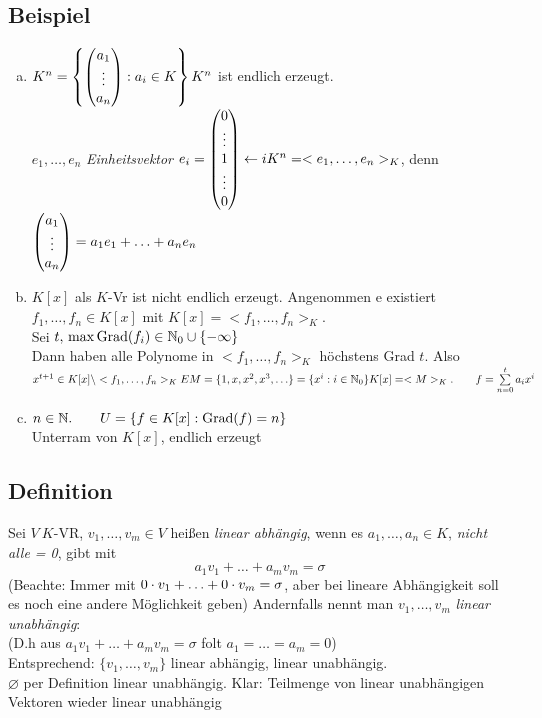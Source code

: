 \subsection{Beispiel}
\begin{enumerate}[a)]
\item $K^n = \left\{ \begin{pmatrix} a_1\\\vdots\\a_n \end{pmatrix} : a_i \in K\right\}\\
K^n$ ist endlich erzeugt.\\
$e_1,\ldots, e_n$ \emph{Einheitsvektor}
$e_i = \begin{pmatrix} 0\\\vdots\\1\\\vdots\\0 \end{pmatrix}\leftarrow i\\
K^n = <e_1,\ldots,e_n>_K$, denn $\begin{pmatrix} a_1\\\vdots\\a_n \end{pmatrix} = a_1e_1 + \ldots + a_ne_n$
\item $K[x]$ als $K$-Vr ist nicht endlich erzeugt. Angenommen e existiert $f_1,\ldots,f_n \in K[x]$ mit $K[x] = <f_1,\ldots,f_n>_K$.\\
Sei $t,\,\max \operatorname{Grad}(f_i) \in \mathbb{N}_0 \cup \{-\infty\}$\\
Dann haben alle Polynome in $<f_1,\ldots,f_n>_K$ höchstens Grad $t$. Also $x^{t+1} \in K[x] \setminus <f_1,\ldots,f_n>_K \Lightning\\
M = \{1,x,x^2,x^3,\ldots \} = \{ x^i: i \in \N_0 \}\\
K[x] = <M>_K.\qquad f = \sum\limits_{n=0}^{t} a_i x^i$
\item $n \in \mathbb{N}. \qquad U = \{ f \in K[x]: \operatorname{Grad}(f) = n \}$\\
Unterram von $K[x]$, endlich erzeugt
\end{enumerate}
\subsection{Definition}
Sei $V\ K$-VR, $v_1,\ldots,v_m \in V$ hei\ss en \emph{linear abhängig}, wenn es $a_1,\ldots,a_n \in K$, \emph{nicht alle = 0}, gibt mit \[ a_1v_1 + \ldots + a_m v_m = \sigma \]
(Beachte: Immer mit $0\cdot v_1 + \ldots + 0 \cdot v_m = \sigma$,
aber bei lineare Abhängigkeit soll es noch eine andere Möglichkeit geben)
Andernfalls nennt man $v_1,\ldots,v_m$ \emph{linear unabhängig}:\\
(D.h aus $a_1v_1+\ldots+a_mv_m = \sigma$ folt $a_1 = \ldots = a_m = 0$)\\
Entsprechend: $\{v_1,\ldots,v_m\}$ linear abhängig, linear unabhängig.\\
$\varnothing$ per Definition linear unabhängig.
Klar: Teilmenge von linear unabhängigen Vektoren wieder linear unabhängig
